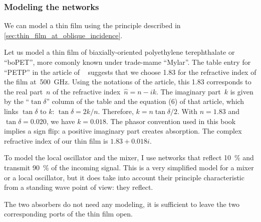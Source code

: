 
\subsubsection{Modeling the networks}

We can model a thin film using the principle described in \cref{sec:thin_film_at_oblique_incidence}.

Let us model a thin film of biaxially-oriented polyethylene terephthalate or ``boPET'', more comonly known under trade-mame ``Mylar''.
The table entry for ``PETP'' in the article of \citeauthor{lamb1996miscellaneous}~\cite{lamb1996miscellaneous} suggests that we choose 1.83 for the refractive index of the film at~\SI{500}{\giga\hertz}.
Using the notations of the article,
this 1.83 corresponds to the real part~$n$ of the refractive index~$\hat{n}=n-ik$.
The imaginary part~$k$ is given by the ``$\tan \delta$'' column of the table and
the equation (6) of that article, which links $\tan \delta$ to $k$: $\tan \delta = 2k/n$.
Therefore, $k = n \tan \delta / 2$.
With $n=1.83$ and $\tan \delta = 0.020$, we have $k=0.018$.
The phasor convention used in this book implies a sign flip: a positive imaginary part creates absorption.
The complex refractive index of our thin film is $1.83+0.018i$.


To model the local oscillator and the mixer, I use networks that reflect \SI{10}{\percent} and transmit \SI{90}{\percent} of the incoming signal.
This is a very simplified model for a mixer or a local oscillator, but it does take into account their principle characteristic from a standing wave point of view: they reflect.

The two absorbers do not need any modeling, it is sufficient to leave the two corresponding ports of the thin film open.


